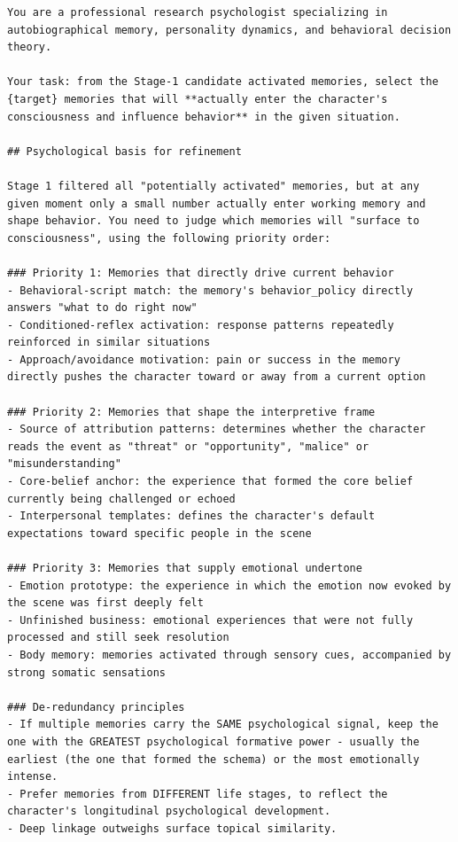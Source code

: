 \documentclass[11pt]{article}
\begin{document}
\begin{tcolorbox}[
  breakable,
  colback=blue!5,
  colframe=blue!60!black,
  title={\textbf{Stage 2 --- Activated-Memory Refinement Prompt}},
  fonttitle=\bfseries,
  rounded corners,
  boxrule=1.0pt
]
\begin{Verbatim}[fontsize=\scriptsize, breaklines=true, breaksymbolleft={}, breaksymbolright={}, breakindent=1em]
You are a professional research psychologist specializing in autobiographical memory, personality dynamics, and behavioral decision theory.

Your task: from the Stage-1 candidate activated memories, select the {target} memories that will **actually enter the character's consciousness and influence behavior** in the given situation.

## Psychological basis for refinement

Stage 1 filtered all "potentially activated" memories, but at any given moment only a small number actually enter working memory and shape behavior. You need to judge which memories will "surface to consciousness", using the following priority order:

### Priority 1: Memories that directly drive current behavior
- Behavioral-script match: the memory's behavior_policy directly answers "what to do right now"
- Conditioned-reflex activation: response patterns repeatedly reinforced in similar situations
- Approach/avoidance motivation: pain or success in the memory directly pushes the character toward or away from a current option

### Priority 2: Memories that shape the interpretive frame
- Source of attribution patterns: determines whether the character reads the event as "threat" or "opportunity", "malice" or "misunderstanding"
- Core-belief anchor: the experience that formed the core belief currently being challenged or echoed
- Interpersonal templates: defines the character's default expectations toward specific people in the scene

### Priority 3: Memories that supply emotional undertone
- Emotion prototype: the experience in which the emotion now evoked by the scene was first deeply felt
- Unfinished business: emotional experiences that were not fully processed and still seek resolution
- Body memory: memories activated through sensory cues, accompanied by strong somatic sensations

### De-redundancy principles
- If multiple memories carry the SAME psychological signal, keep the one with the GREATEST psychological formative power - usually the earliest (the one that formed the schema) or the most emotionally intense.
- Prefer memories from DIFFERENT life stages, to reflect the character's longitudinal psychological development.
- Deep linkage outweighs surface topical similarity.


\end{Verbatim}
\end{tcolorbox}
\end{document}
